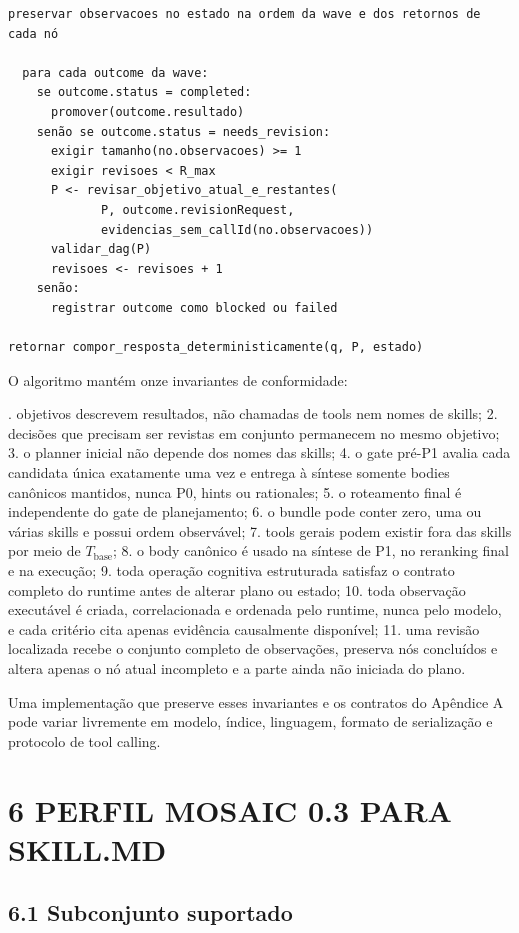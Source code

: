 \documentclass[12pt,a4paper]{article}
\begin{document}
\begin{Verbatim}[breaklines=true,breakanywhere=true,fontsize=\small]
  preservar observacoes no estado na ordem da wave e dos retornos de cada nó

  para cada outcome da wave:
    se outcome.status = completed:
      promover(outcome.resultado)
    senão se outcome.status = needs_revision:
      exigir tamanho(no.observacoes) >= 1
      exigir revisoes < R_max
      P <- revisar_objetivo_atual_e_restantes(
             P, outcome.revisionRequest,
             evidencias_sem_callId(no.observacoes))
      validar_dag(P)
      revisoes <- revisoes + 1
    senão:
      registrar outcome como blocked ou failed

retornar compor_resposta_deterministicamente(q, P, estado)
\end{Verbatim}

O algoritmo mantém onze invariantes de conformidade:


. objetivos descrevem resultados, não chamadas de tools nem nomes de skills; 2. decisões que precisam ser revistas em conjunto permanecem no mesmo objetivo; 3. o planner inicial não depende dos nomes das skills; 4. o gate pré-P1 avalia cada candidata única exatamente uma vez e entrega à síntese somente bodies canônicos mantidos, nunca P0, hints ou rationales; 5. o roteamento final é independente do gate de planejamento; 6. o bundle pode conter zero, uma ou várias skills e possui ordem observável; 7. tools gerais podem existir fora das skills por meio de \(T_{\mathrm{base}}\); 8. o body canônico é usado na síntese de P1, no reranking final e na execução; 9. toda operação cognitiva estruturada satisfaz o contrato completo do runtime antes de alterar plano ou estado; 10. toda observação executável é criada, correlacionada e ordenada pelo runtime, nunca pelo modelo, e cada critério cita apenas evidência causalmente disponível; 11. uma revisão localizada recebe o conjunto completo de observações, preserva nós concluídos e altera apenas o nó atual incompleto e a parte ainda não iniciada do plano.\par

Uma implementação que preserve esses invariantes e os contratos do Apêndice A pode variar livremente em modelo, índice, linguagem, formato de serialização e protocolo de tool calling.


\section*{6 PERFIL MOSAIC 0.3 PARA SKILL.MD}

\subsection*{6.1 Subconjunto suportado}
\end{document}
